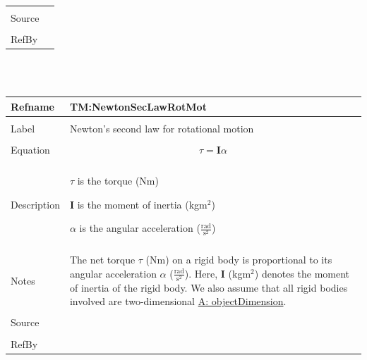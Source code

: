 \documentclass[12pt]{article}
\begin{document}
\begin{minipage}{\textwidth}
\begin{tabular}{p{} p{}}
                                         \\ \midrule \\
                                         Source & \\ \midrule \\
                                                  RefBy & 
\\ \bottomrule \end{tabular}
\end{minipage}\\
~\newline
 \noindent \begin{minipage}{\textwidth}
\begin{tabular}{p{} p{}}
\toprule \textbf{Refname} & \textbf{TM:NewtonSecLawRotMot}
\label{TM:NewtonSecLawRotMot}
\\ \midrule \\
Label & Newton's second law for rotational motion
        \\ \midrule \\
        Equation & \begin{displaymath}
                   τ=\mathbf{I} α
                   \end{displaymath}
                   \\ \midrule \\
                   Description & \begin{symbDescription}
                                 \item{$τ$ is the torque (Nm)}
                                 \item{$\mathbf{I}$ is the moment of inertia (kg$\text{m}^{2}$)}
                                 \item{$α$ is the angular acceleration ($\frac{\text{rad}}{\text{s}^{2}}$)}
                                 \end{symbDescription}
                                 \\ \midrule \\
                                 Notes & The net torque $τ$ (Nm) on a rigid body is proportional to its angular acceleration $α$ ($\frac{\text{rad}}{\text{s}^{2}}$). Here, $\mathbf{I}$ (kg$\text{m}^{2}$) denotes the moment of inertia of the rigid body. We also assume that all rigid bodies involved are two-dimensional \hyperref[A:objectDimension]{A: objectDimension}.
                                         \\ \midrule \\
                                         Source & \\ \midrule \\
                                                  RefBy & 
\\ \bottomrule \end{tabular}
\end{minipage}\\
\end{document}

